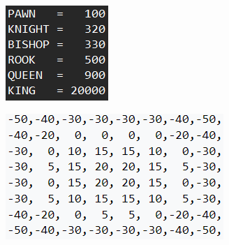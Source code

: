 \begin{figure}[h]
    \centering
    \begin{minipage}{.49\textwidth}
      \centering
      \includegraphics{figures/pieces_values.png}
      \label{fig:piecesValues}
    \end{minipage}
    \begin{minipage}{.49\textwidth}
      \centering
      \includegraphics{figures/knight_value_table.png}
      \label{fig:knightValueTable}
    \end{minipage}
\end{figure}


